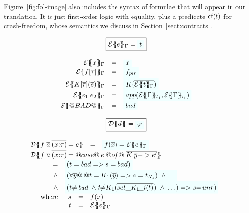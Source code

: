Figure~\ref{fig:fol-image}
also includes the syntax of formulae that will appear in our translation.
It is just first-order logic with equality, plus a predicate $\textsf{cf}(t)$ for 
crash-freedom, whose semantics we discuss in Section~\ref{sect:contracts}.


\begin{figure}\small
\setlength{\arraycolsep}{2pt} 
\[\begin{array}{c} 
\ruleform{\etrans{\Sigma}{\Gamma}{e} = \formula{t} } \\ \\
\begin{array}{rcl}
\etrans{\Sigma}{\Gamma}{x} & = & \formula{x} \\
\etrans{\Sigma}{\Gamma}{f[\ol{\tau}]} & = & \formula{f_{ptr}} \\
\etrans{\Sigma}{\Gamma}{K[\ol{\tau}](\ol{e})} & = & \formula{K(\ol{\etrans{e}{\Gamma}{t}})} \\
\etrans{\Sigma}{\Gamma}{e_1\;e_2} & = & \formula{app(\etrans{\Sigma}{t_1}{\Gamma},
                                                     \etrans{\Sigma}{t_1}{\Gamma})} \\
\etrans{\Sigma}{\Gamma}{@BAD@} & = & \formula{\bad}
\end{array}
\\ \\
\ruleform{\dtrans{\Sigma}{d} = \formula{\phi}} \\ \\
\begin{array}{rcl}
\dtrans{\Sigma}{f \;\ol{a}\;\ol{(x{:}\tau)} = e} 
  & = & \formula{f(\ol{x}) = \etrans{\Sigma}{\Gamma}{e}} \\
\multicolumn{3}{l}{\dtrans{\Sigma}
    {f \;\ol{a}\;\ol{(x{:}\tau)} = @case@\;e\;@of@\;\ol{K\;\ol{y} -> e'}}} \\
\multicolumn{3}{l}{
\quad 
  \begin{array}[t]{rl}
    = & \formula{(t = \bad => s = bad)} \\ 
    \land & \formula{(\forall \ol{y} @.@ t = K_1(\ol{y}) => s = t_{K_1})\;\land \ldots}  \\
    \land & \formula{(t{\neq}\bad\;\land\;
                 t{\neq}K_1(\oln{{\sel{K_1}{i}}(t)}{})\;\land\;\ldots) => s{=}\unr)} \\
    \mbox{where} &  
         \begin{array}[t]{rcl} 
            s & = & f(\ol{x}) \\  
            t & = & \etrans{\Sigma}{\Gamma}{e} 
         \end{array}

\end{array}}
\end{array}
\end{array}\]
\end{figure}
